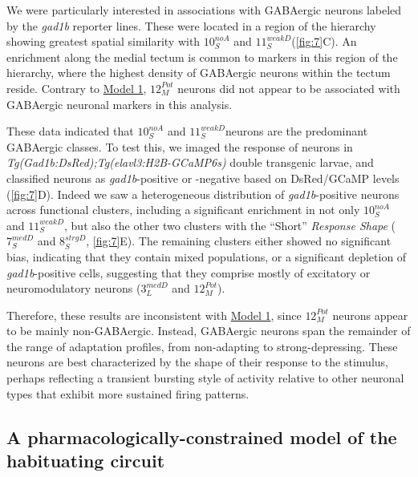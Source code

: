 \documentclass[9pt,lineno]{RandlettLab_elife}
\begin{document}
We were particularly interested in associations with GABAergic neurons labeled by the \emph{gad1b} reporter lines. These were located in a region of the hierarchy showing greatest spatial similarity with $10_{S}^{noA}$ and $11_{S}^{weakD}$(\autoref{fig:7}C). An enrichment along the medial tectum is common to markers in this region of the hierarchy, where the highest density of GABAergic neurons within the tectum reside. Contrary to \underline{Model 1}, $12_{M}^{Pot}$ neurons did not appear to be associated with GABAergic neuronal markers in this analysis.  

These data indicated that $10_{S}^{noA}$ and $11_{S}^{weakD}$neurons are the predominant GABAergic classes. To test this, we imaged the response of neurons in \emph{Tg(Gad1b:DsRed);Tg(elavl3:H2B-GCaMP6s)} double transgenic larvae,  and classified neurons as \emph{gad1b}-positive or -negative based on DsRed/GCaMP levels (\autoref{fig:7}D). Indeed we saw a heterogeneous distribution of \emph{gad1b}-positive neurons across functional clusters, including a significant enrichment in not only $10_{S}^{noA}$ and $11_{S}^{weakD}$, but also the other two clusters with the “Short” \emph{Response Shape} ($7_{S}^{medD}$ and $8_{S}^{strgD}$, \autoref{fig:7}E). The remaining clusters either showed no significant bias, indicating that they contain mixed populations, or a significant depletion of \emph{gad1b}-positive cells, suggesting that they comprise mostly of excitatory or neuromodulatory neurons ($3_{L}^{medD}$ and $12_{M}^{Pot}$). 

Therefore, these results are inconsistent with \underline{Model 1}, since $12_{M}^{Pot}$ neurons appear to be mainly non-GABAergic. Instead, GABAergic neurons span the remainder of the range of adaptation profiles, from non-adapting to strong-depressing. These neurons are best characterized by the shape of their response to the stimulus, perhaps reflecting a transient bursting style of activity relative to other neuronal types that exhibit more sustained firing patterns. 

\subsection{A pharmacologically-constrained model of the habituating circuit}
\end{document}
